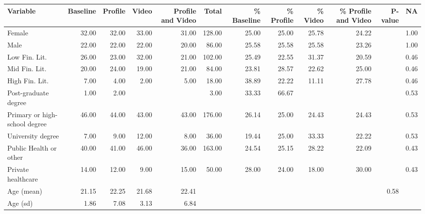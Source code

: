 \begin{tabular}{lrrrrrrrrrrr}
  \hline
Variable & Baseline & Profile & Video & Profile and Video & Total & \% Baseline & \% Profile & \% Video & \% Profile and Video & P-value & NA \\ 
  \hline
Female & 32.00 & 32.00 & 33.00 & 31.00 & 128.00 & 25.00 & 25.00 & 25.78 & 24.22 &  & 1.00 \\ 
  Male & 22.00 & 22.00 & 22.00 & 20.00 & 86.00 & 25.58 & 25.58 & 25.58 & 23.26 &  & 1.00 \\ 
  Low Fin. Lit. & 26.00 & 23.00 & 32.00 & 21.00 & 102.00 & 25.49 & 22.55 & 31.37 & 20.59 &  & 0.46 \\ 
  Mid Fin. Lit. & 20.00 & 24.00 & 19.00 & 21.00 & 84.00 & 23.81 & 28.57 & 22.62 & 25.00 &  & 0.46 \\ 
  High Fin. Lit. & 7.00 & 4.00 & 2.00 & 5.00 & 18.00 & 38.89 & 22.22 & 11.11 & 27.78 &  & 0.46 \\ 
  Post-graduate degree & 1.00 & 2.00 &  &  & 3.00 & 33.33 & 66.67 &  &  &  & 0.53 \\ 
  Primary or high-school degree & 46.00 & 44.00 & 43.00 & 43.00 & 176.00 & 26.14 & 25.00 & 24.43 & 24.43 &  & 0.53 \\ 
  University degree & 7.00 & 9.00 & 12.00 & 8.00 & 36.00 & 19.44 & 25.00 & 33.33 & 22.22 &  & 0.53 \\ 
  Public Health or other & 40.00 & 41.00 & 46.00 & 36.00 & 163.00 & 24.54 & 25.15 & 28.22 & 22.09 &  & 0.43 \\ 
  Private healthcare & 14.00 & 12.00 & 9.00 & 15.00 & 50.00 & 28.00 & 24.00 & 18.00 & 30.00 &  & 0.43 \\ 
  Age (mean) & 21.15 & 22.25 & 21.68 & 22.41 &  &  &  &  &  & 0.58 &  \\ 
  Age (sd) & 1.86 & 7.08 & 3.13 & 6.84 &  &  &  &  &  &  &  \\ 
   \hline
\end{tabular}
